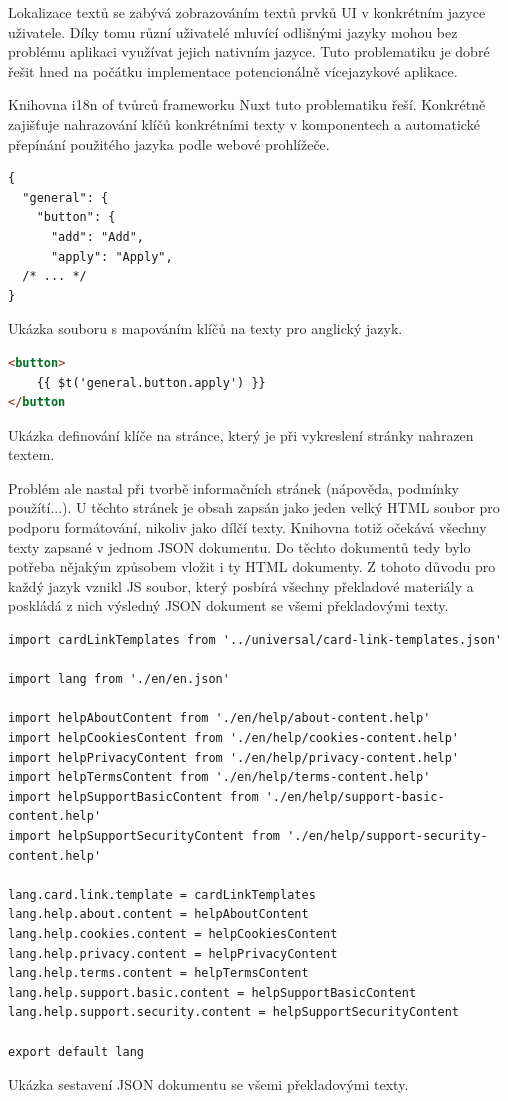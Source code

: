 		Lokalizace textů se zabývá zobrazováním textů prvků \ac{UI} v konkrétním jazyce uživatele.
		Díky tomu různí uživatelé mluvící odlišnými jazyky mohou bez problému aplikaci využívat jejich nativním jazyce.
		Tuto problematiku je dobré řešit hned na počátku implementace potencionálně vícejazykové aplikace.

		Knihovna i18n of tvůrců frameworku Nuxt tuto problematiku řeší.
		Konkrétně zajišťuje nahrazování klíčů konkrétními texty v komponentech a automatické přepínání použitého jazyka
		podle webové prohlížeče.

		\begin{lstlisting}
{
  "general": {
    "button": {
      "add": "Add",
      "apply": "Apply",
  /* ... */
}
		\end{lstlisting}
		Ukázka souboru s mapováním klíčů na texty pro anglický jazyk. %

		\begin{lstlisting}[language=HTML]
<button>
	{{ $t('general.button.apply') }}
</button
		\end{lstlisting}
		Ukázka definování klíče na stránce, který je při vykreslení stránky nahrazen textem. %

		Problém ale nastal při tvorbě informačních stránek (nápověda, podmínky použítí...).
		U těchto stránek je obsah zapsán jako jeden velký \ac{HTML} soubor pro podporu formátování, nikoliv
		jako dílčí texty.
		Knihovna totiž očekává všechny texty zapsané v jednom \ac{JSON} dokumentu.
		Do těchto dokumentů tedy bylo potřeba nějakým způsobem vložit i ty \ac{HTML} dokumenty.
		Z tohoto důvodu pro každý jazyk vznikl \ac{JS} soubor, který posbírá všechny překladové materiály a poskládá z nich
		výsledný \ac{JSON} dokument se všemi překladovými texty.

		\begin{lstlisting}
import cardLinkTemplates from '../universal/card-link-templates.json'

import lang from './en/en.json'

import helpAboutContent from './en/help/about-content.help'
import helpCookiesContent from './en/help/cookies-content.help'
import helpPrivacyContent from './en/help/privacy-content.help'
import helpTermsContent from './en/help/terms-content.help'
import helpSupportBasicContent from './en/help/support-basic-content.help'
import helpSupportSecurityContent from './en/help/support-security-content.help'

lang.card.link.template = cardLinkTemplates
lang.help.about.content = helpAboutContent
lang.help.cookies.content = helpCookiesContent
lang.help.privacy.content = helpPrivacyContent
lang.help.terms.content = helpTermsContent
lang.help.support.basic.content = helpSupportBasicContent
lang.help.support.security.content = helpSupportSecurityContent

export default lang
		\end{lstlisting}
		Ukázka sestavení JSON dokumentu se všemi překladovými texty. %

